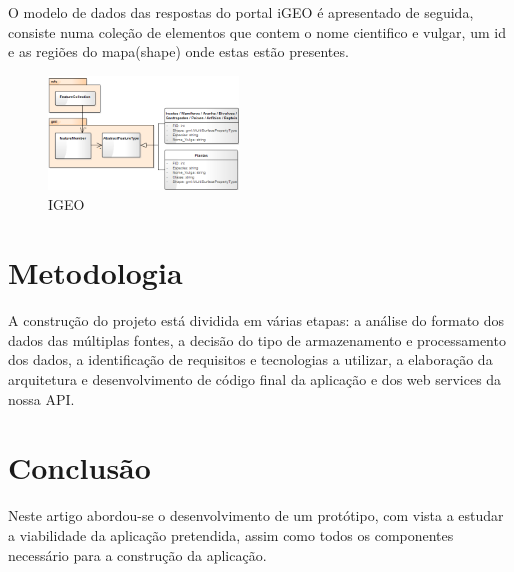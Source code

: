 \documentclass[twocolumn,twoside,11pt,a4paper]{article}
\begin{document}
O modelo de dados das respostas do portal iGEO é apresentado de seguida, consiste numa coleção de elementos que contem o nome cientifico e vulgar, um id e as regiões do mapa(shape) onde estas estão presentes.

\begin{figure}[ht!]
	\begin{center}
		\leavevmode
		\includegraphics[width=0.45\textwidth]{igeo}
		\caption{IGEO}
		\label{fig:arch}
	\end{center}
\end{figure}

\section{Metodologia}\label{sec:metod}
A construção do projeto está dividida em várias etapas: a análise do formato dos dados das múltiplas fontes, a decisão do tipo de armazenamento e processamento dos dados, a identificação de requisitos e tecnologias a utilizar, a elaboração da arquitetura e desenvolvimento de código final da aplicação e dos web services da nossa API.




\section{Conclusão}\label{sec:conclusions}

	Neste artigo abordou-se o desenvolvimento de um protótipo, com vista a estudar a viabilidade da aplicação pretendida, assim como todos os componentes necessário para a construção da aplicação.



\renewcommand{\bibname}{Referências}
%
%

%


\end{document}
